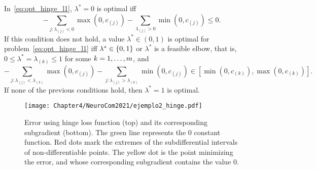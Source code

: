 \begin{prop}\label{prop:hinge_neurocom2020}
    In~\eqref{eq:opt_hinge_l1}, $\lambda^*=0$ is optimal iff
    \begin{equation}\label{eq:sol_hinge_0}
        -\sum_{j: \lambda_{(j)}<0} \max(0, c_{(j)}) - \sum_{\lambda_{(j)}>0} \min(0, c_{(j)}) \leq 0 .
        \end{equation}
        If this condition does not hold, a value $\lambda^* \in (0, 1)$ is optimal for problem~\eqref{eq:opt_hinge_l1} iff $\lambda^* \in \left\{0, 1\right\}$ or $\lambda^*$ is a feasible elbow, that is, $0 \leq \lambda^* = \lambda_{(k)} \leq 1$ for some $k=1, \dotsc, m$, and
    \begin{equation}\label{eq:sol_hinge}
        -\sum_{j: \lambda_{(j)}< \lambda_{(k)}} \max(0, c_{(j)}) - \sum_{j: \lambda_{(j)}>  \lambda_{(k)}} \min(0, c_{(j)}) \in \left[\min(0, c_{(k)}), \max(0, c_{(k)}) \right] .
    \end{equation}
    If none of the previous conditions hold, then $\lambda^*=1$ is optimal.
\end{prop}
\begin{figure}[t!]
    \centering
    \texttt{[image: Chapter4/NeuroCom2021/ejemplo2\_hinge.pdf]}
    \caption{Error using hinge loss function (top) and its corresponding subgradient (bottom). The green line represents the $0$ constant function. Red dots mark the extremes of the subdifferential intervals of non-differentiable points. The yellow dot is the point minimizing the error, and whose corresponding subgradient contains the value $0$.}
    \label{fig:hinge_error}
\end{figure}

